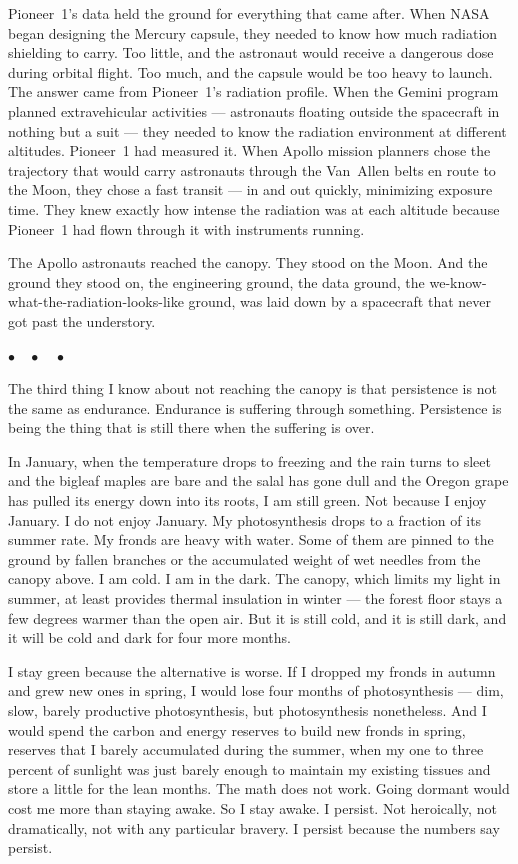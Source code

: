 \documentclass[12pt, letterpaper]{article}
\begin{document}
Pioneer~1's data held the ground for everything that came after. When NASA began designing the Mercury capsule, they needed to know how much radiation shielding to carry. Too little, and the astronaut would receive a dangerous dose during orbital flight. Too much, and the capsule would be too heavy to launch. The answer came from Pioneer~1's radiation profile. When the Gemini program planned extravehicular activities --- astronauts floating outside the spacecraft in nothing but a suit --- they needed to know the radiation environment at different altitudes. Pioneer~1 had measured it. When Apollo mission planners chose the trajectory that would carry astronauts through the Van~Allen belts en route to the Moon, they chose a fast transit --- in and out quickly, minimizing exposure time. They knew exactly how intense the radiation was at each altitude because Pioneer~1 had flown through it with instruments running.

The Apollo astronauts reached the canopy. They stood on the Moon. And the ground they stood on, the engineering ground, the data ground, the we-know-what-the-radiation-looks-like ground, was laid down by a spacecraft that never got past the understory.

\begin{center}
$\bullet\quad\bullet\quad\bullet$
\end{center}

The third thing I know about not reaching the canopy is that persistence is not the same as endurance. Endurance is suffering through something. Persistence is being the thing that is still there when the suffering is over.

In January, when the temperature drops to freezing and the rain turns to sleet and the bigleaf maples are bare and the salal has gone dull and the Oregon grape has pulled its energy down into its roots, I am still green. Not because I enjoy January. I do not enjoy January. My photosynthesis drops to a fraction of its summer rate. My fronds are heavy with water. Some of them are pinned to the ground by fallen branches or the accumulated weight of wet needles from the canopy above. I am cold. I am in the dark. The canopy, which limits my light in summer, at least provides thermal insulation in winter --- the forest floor stays a few degrees warmer than the open air. But it is still cold, and it is still dark, and it will be cold and dark for four more months.

I stay green because the alternative is worse. If I dropped my fronds in autumn and grew new ones in spring, I would lose four months of photosynthesis --- dim, slow, barely productive photosynthesis, but photosynthesis nonetheless. And I would spend the carbon and energy reserves to build new fronds in spring, reserves that I barely accumulated during the summer, when my one to three percent of sunlight was just barely enough to maintain my existing tissues and store a little for the lean months. The math does not work. Going dormant would cost me more than staying awake. So I stay awake. I persist. Not heroically, not dramatically, not with any particular bravery. I persist because the numbers say persist.
\end{document}
